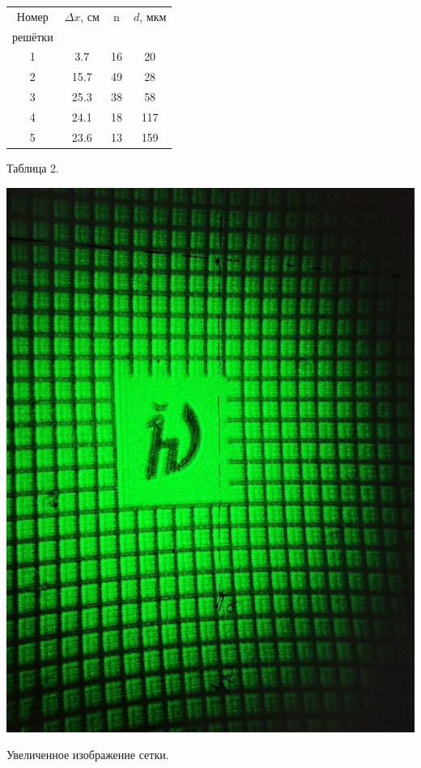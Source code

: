\begin{minipage}{0.47\textwidth}
\begin{center}
\begin{tabular}{|c|c|c|c|}
\hline
Номер &$\Delta x$, см &  n&$d$, мкм\\
решётки&		&			& \\
\hline
1 &	3.7	&	16	& 	20		\\
\hline
2&	15.7	&	49	&	28		\\
\hline
3&	25.3	&	38	&	58		\\
\hline
4&	24.1	&	18	&	117		\\
\hline
5&	23.6	&	13	&	159	 	\\
\hline
\end{tabular}
\newline
\newline
Таблица 2. 
\end{center}
\end{minipage}
\begin{minipage}{0.47\textwidth}
\begin{center}
\includegraphics[width = \textwidth]{images/3.jpg}
\end{center}

\begin{center}
Увеличенное изображение сетки.
\end{center}
\end{minipage}

